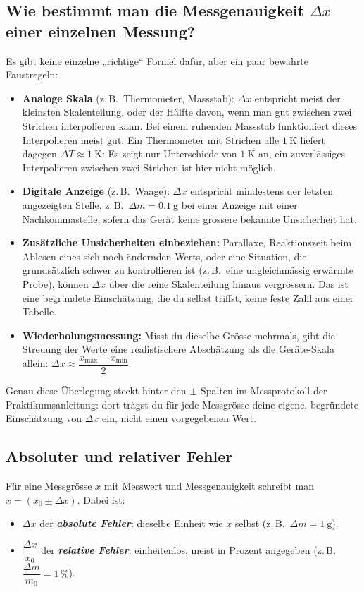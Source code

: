 \documentclass[11pt,a4paper]{article}
\begin{document}
\subsection{Wie bestimmt man die Messgenauigkeit $\Delta x$ einer einzelnen Messung?}
Es gibt keine einzelne „richtige“ Formel dafür, aber ein paar bewährte Faustregeln:
\begin{itemize}
  \item \textbf{Analoge Skala} (z.\,B.\ Thermometer, Massstab): $\Delta x$ entspricht meist der kleinsten Skalenteilung, oder der Hälfte davon, wenn man gut zwischen zwei Strichen interpolieren kann. Bei einem ruhenden Massstab funktioniert dieses Interpolieren meist gut. Ein Thermometer mit Strichen alle $1\ \mathrm{K}$ liefert dagegen $\Delta T\approx 1\ \mathrm{K}$: Es zeigt nur Unterschiede von $1\ \mathrm{K}$ an, ein zuverlässiges Interpolieren zwischen zwei Strichen ist hier nicht möglich.
  \item \textbf{Digitale Anzeige} (z.\,B.\ Waage): $\Delta x$ entspricht mindestens der letzten angezeigten Stelle, z.\,B.\ $\Delta m = 0.1\ \mathrm{g}$ bei einer Anzeige mit einer Nachkommastelle, sofern das Gerät keine grössere bekannte Unsicherheit hat.
  \item \textbf{Zusätzliche Unsicherheiten einbeziehen:} Parallaxe, Reaktionszeit beim Ablesen eines sich noch ändernden Werts, oder eine Situation, die grundsätzlich schwer zu kontrollieren ist (z.\,B.\ eine ungleichmässig erwärmte Probe), können $\Delta x$ über die reine Skalenteilung hinaus vergrössern. Das ist eine begründete Einschätzung, die du selbst triffst, keine feste Zahl aus einer Tabelle.
  \item \textbf{Wiederholungsmessung:} Misst du dieselbe Grösse mehrmals, gibt die Streuung der Werte eine realistischere Abschätzung als die Geräte-Skala allein: $\Delta x \approx \dfrac{x_{\max}-x_{\min}}{2}$.
\end{itemize}
Genau diese Überlegung steckt hinter den $\pm$-Spalten im Messprotokoll der Praktikumsanleitung: dort trägst du für jede Messgrösse deine eigene, begründete Einschätzung von $\Delta x$ ein, nicht einen vorgegebenen Wert.

\subsection{Absoluter und relativer Fehler}
Für eine Messgrösse $x$ mit Messwert und Messgenauigkeit schreibt man $x=(x_0\pm\Delta x)$. Dabei ist:
\begin{itemize}
  \item $\Delta x$ der \textbf{\emph{absolute Fehler}}: dieselbe Einheit wie $x$ selbst (z.\,B.\ $\Delta m = 1\ \mathrm{g}$).
  \item $\dfrac{\Delta x}{x_0}$ der \textbf{\emph{relative Fehler}}: einheitenlos, meist in Prozent angegeben (z.\,B.\ $\dfrac{\Delta m}{m_0}=1\,\%$).
\end{itemize}
\end{document}

